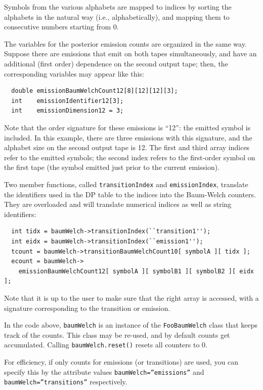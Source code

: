 \documentclass{article}
\begin{document}
Symbols from the various alphabets are mapped to indices by sorting the alphabets
in the natural way (i.e., alphabetically), and mapping them to consecutive numbers
starting from 0.

The variables for the posterior emission counts are organized in the same way.  
Suppose there are emissions that emit on both tapes simultaneously, and have an 
additional (first order) dependence on the second output tape; then, the corresponding 
variables may appear like this:

\begin{verbatim}
  double emissionBaumWelchCount12[8][12][12][3];
  int    emissionIdentifier12[3];
  int    emissionDimension12 = 3;
\end{verbatim}
Note that the order signature for these emissions is ``12'': the emitted symbol is
included.  In this example, there are three emissions with this signature, 
and the alphabet size on the second output tape is 12.  
The first and third array indices refer to the emitted symbols; the second index 
refers to the first-order symbol on the first tape (the symbol emitted just prior to
the current emission).

Two member functions, called {\tt transitionIndex} and {\tt emissionIndex}, translate
the identifiers used in the DP table to the indices into the Baum-Welch counters.
They are overloaded and will translate numerical indices as well as string identifiers:
\begin{verbatim}
  int tidx = baumWelch->transitionIndex(``transition1'');
  int eidx = baumWelch->transitionIndex(``emission1'');
  tcount = baumWelch->transitionBaumWelchCount10[ symbolA ][ tidx ];
  ecount = baumWelch->
    emissionBaumWelchCount12[ symbolA ][ symbolB1 ][ symbolB2 ][ eidx ];
\end{verbatim}
Note that it is up to the user to make sure that the right array is accessed, with a signature 
corresponding to the transition or emission.

In the code above, {\tt baumWelch} is an instance of the {\tt FooBaumWelch} class that keeps 
track of the counts.  This class may be re-used, and by default counts get accumulated.  
Calling {\tt baumWelch.reset()} resets all counters to 0.

For efficiency, if only counts for emissions (or transitions) are used, you can specify this
by the attribute values {\tt baumWelch=''emissions''} and {\tt baumWelch=''transitions''} 
respectively.
\end{document}
